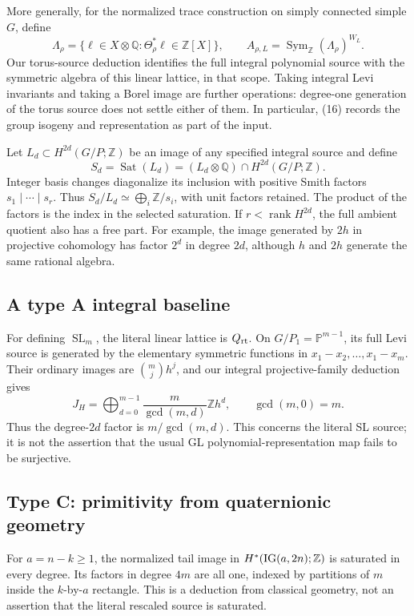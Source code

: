 \documentclass[11pt,letterpaper]{article}
\newcommand{\Z}{\mathbb Z}\newcommand{\Q}{\mathbb Q}\newcommand{\C}{\mathbb C}
\newcommand{\Sym}{\operatorname{Sym}}\newcommand{\Rep}{\operatorname{Rep}}
\newcommand{\SL}{\operatorname{SL}}\newcommand{\GL}{\operatorname{GL}}
\newcommand{\Sat}{\operatorname{Sat}}\newcommand{\Fitt}{\operatorname{Fitt}}
\newcommand{\rk}{\operatorname{rank}}\newcommand{\Tor}{\operatorname{Tor}}
\theoremstyle{definition}\newtheorem{definition}[theorem]{Definition}
\begin{document}
More generally, for the normalized trace construction on simply
connected simple \(G\), define
\[
 \Lambda_\rho=\{\ell\in X\otimes\Q:
                 \Theta_\rho^*\ell\in\Z[X]\},\qquad
 A_{\rho,L}=\Sym_\Z(\Lambda_\rho)^{W_L}.
 \tag{16}
\]
Our torus-source deduction identifies the full integral polynomial
source with the symmetric algebra of this linear lattice, in that
scope. Taking integral Levi invariants and taking a Borel image are
further operations: degree-one generation of the torus source does
not settle either of them. In particular, (16) records the group
isogeny and representation as part of the input.

Let \(L_d\subset H^{2d}(G/P;\Z)\) be an image of any specified integral
source and define
\[
 S_d=\Sat(L_d)=(L_d\otimes\Q)\cap H^{2d}(G/P;\Z).
 \tag{17}
\]
Integer basis changes diagonalize its inclusion with positive Smith
factors \(s_1\mid\cdots\mid s_r\). Thus
\(S_d/L_d\simeq\bigoplus_i\Z/s_i\), with unit factors retained.
The product of the factors is the index in the selected saturation.
If \(r<\rk H^{2d}\), the full ambient quotient also has a free part.
For example, the image generated by \(2h\) in projective cohomology
has factor \(2^d\) in degree \(2d\), although \(h\) and \(2h\)
generate the same rational algebra.

\subsection{A type A integral baseline}
For defining \(\SL_m\), the literal linear lattice is \(Q_{\rm rt}\).
On \(G/P_1=\mathbb P^{m-1}\), its full Levi source is generated by
the elementary symmetric functions in \(x_1-x_2,\ldots,x_1-x_m\).
Their ordinary images are \(\binom mj h^j\), and our integral
projective-family deduction gives
\[
 J_H=\bigoplus_{d=0}^{m-1}\frac{m}{\gcd(m,d)}\Z h^d,
 \qquad \gcd(m,0)=m.
\]
Thus the degree-\(2d\) factor is \(m/\gcd(m,d)\). This concerns
the literal SL source; it is not the assertion that the usual
GL polynomial-representation map fails to be surjective.

\subsection{Type C: primitivity from quaternionic geometry}
For \(a=n-k\ge1\), the normalized tail image in
\(H^*(\IG(a,2n);\Z)\) is saturated in every degree.
Its factors in degree \(4m\) are all one, indexed by partitions
of \(m\) inside the \(k\)-by-\(a\) rectangle.
This is a deduction from classical geometry, not an assertion that
the literal rescaled source is saturated.
\end{document}
